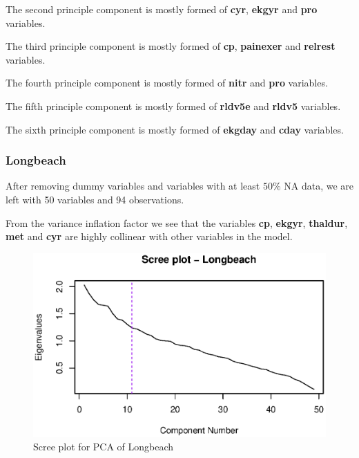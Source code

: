 \documentclass[a4paper]{article}
\begin{document}
The second principle component is mostly formed of \textbf{cyr}, \textbf{ekgyr} and \textbf{pro} variables.

The third principle component is mostly formed of \textbf{cp}, \textbf{painexer} and \textbf{relrest} variables.

The fourth principle component is mostly formed of \textbf{nitr} and \textbf{pro} variables.

The fifth principle component is mostly formed of \textbf{rldv5e} and \textbf{rldv5} variables.

The sixth principle component is mostly formed of \textbf{ekgday} and \textbf{cday} variables.

\subsubsection{Longbeach}

After removing dummy variables and variables with at least $50\%$ NA data, we are left with 50 variables and 94 observations.



From the variance inflation factor we see that the variables \textbf{cp}, \textbf{ekgyr}, \textbf{thaldur}, \textbf{met} and \textbf{cyr} are highly collinear with other variables in the model.

\begin{figure}[H]
	\begin{center}
		\includegraphics[width=12cm]{question3output/lonscreeplot.eps}
	\end{center}
	\caption{Scree plot for PCA of Longbeach}
	\label{q3-lon-screeplot}
\end{figure}
\end{document}
